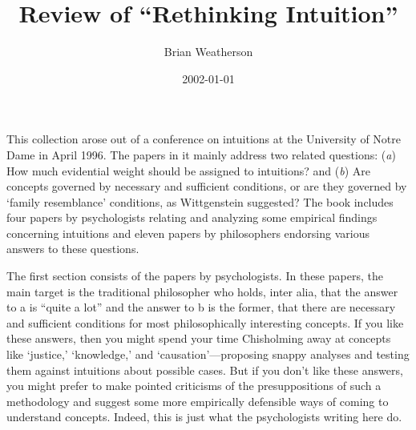 \documentclass[
  11pt,
  letterpaper,
  DIV=11,
  numbers=noendperiod,
  oneside]{scrartcl}
\title{Review of ``Rethinking Intuition''}
\author{Brian Weatherson}
\date{2002-01-01}
\begin{document}
\maketitle
This collection arose out of a conference on intuitions at the
University of Notre Dame in April 1996. The papers in it mainly address
two related questions: (\emph{a}) How much evidential weight should be
assigned to intuitions? and (\emph{b}) Are concepts governed by
necessary and sufficient conditions, or are they governed by `family
resemblance' conditions, as Wittgenstein suggested? The book includes
four papers by psychologists relating and analyzing some empirical
findings concerning intuitions and eleven papers by philosophers
endorsing various answers to these questions.


The first section consists of the papers by psychologists. In these
papers, the main target is the traditional philosopher who holds, inter
alia, that the answer to a is ``quite a lot'' and the answer to b is the
former, that there are necessary and sufficient conditions for most
philosophically interesting concepts. If you like these answers, then
you might spend your time Chisholming away at concepts like `justice,'
`knowledge,' and `causation'---proposing snappy analyses and testing
them against intuitions about possible cases. But if you don't like
these answers, you might prefer to make pointed criticisms of the
presuppositions of such a methodology and suggest some more empirically
defensible ways of coming to understand concepts. Indeed, this is just
what the psychologists writing here do.
\end{document}

